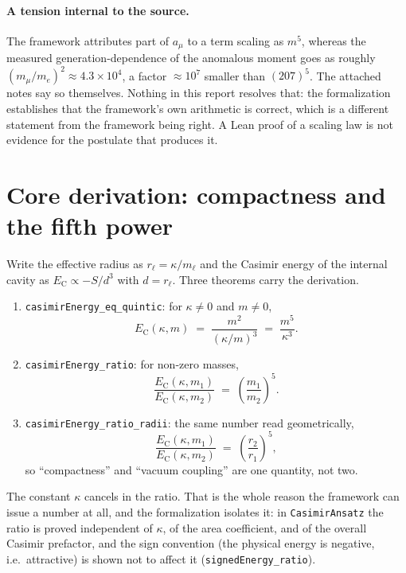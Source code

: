 \documentclass[11pt,a4paper]{article}
\begin{document}
\paragraph{A tension internal to the source.}
The framework attributes part of $a_\mu$ to a term scaling as $m^5$, whereas the
measured generation-dependence of the anomalous moment goes as roughly
$(m_\mu/m_e)^2 \approx 4.3\times10^{4}$, a factor $\approx 10^{7}$ smaller than
$(207)^5$.  The attached notes say so themselves.  Nothing in this report
resolves that: the formalization establishes that the framework's own arithmetic
is correct, which is a different statement from the framework being right.  A
Lean proof of a scaling law is not evidence for the postulate that produces it.


\section{Core derivation: compactness and the fifth power}
\label{sec:core}

Write the effective radius as $r_\ell = \kappa/m_\ell$ and the Casimir energy of
the internal cavity as $E_\mathrm{C} \propto -S/d^3$ with $d = r_\ell$.  Three
theorems carry the derivation.

\begin{enumerate}[leftmargin=*]
\item \texttt{casimirEnergy\_eq\_quintic}: for $\kappa \neq 0$ and $m \neq 0$,
  \[
    E_\mathrm{C}(\kappa,m) \;=\; \frac{m^2}{(\kappa/m)^3} \;=\; \frac{m^5}{\kappa^3}.
  \]
\item \texttt{casimirEnergy\_ratio}: for non-zero masses,
  \[
    \frac{E_\mathrm{C}(\kappa,m_1)}{E_\mathrm{C}(\kappa,m_2)} \;=\; \left(\frac{m_1}{m_2}\right)^{5}.
  \]
\item \texttt{casimirEnergy\_ratio\_radii}: the same number read geometrically,
  \[
    \frac{E_\mathrm{C}(\kappa,m_1)}{E_\mathrm{C}(\kappa,m_2)} \;=\; \left(\frac{r_2}{r_1}\right)^{5},
  \]
  so ``compactness'' and ``vacuum coupling'' are one quantity, not two.
\end{enumerate}

The constant $\kappa$ cancels in the ratio.  That is the whole reason the
framework can issue a number at all, and the formalization isolates it: in
\texttt{CasimirAnsatz} the ratio is proved independent of $\kappa$, of the
area coefficient, and of the overall Casimir prefactor, and the sign convention
(the physical energy is negative, i.e.\ attractive) is shown not to affect it
(\texttt{signedEnergy\_ratio}).
\end{document}
